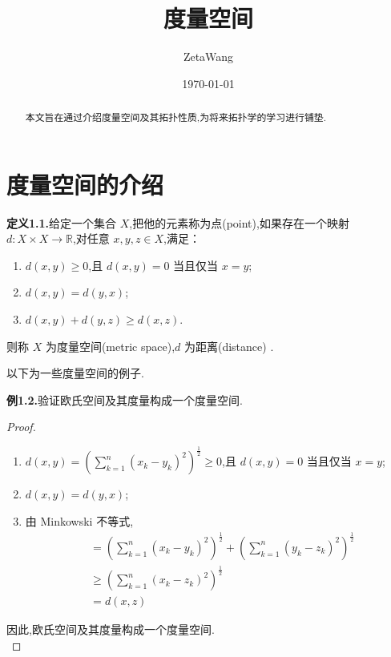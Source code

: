 \documentclass[12pt]{article}
\title{度量空间}
\author{ZetaWang}
\date{\today}
\begin{document}
\maketitle

\begin{abstract}
本文旨在通过介绍度量空间及其拓扑性质,为将来拓扑学的学习进行铺垫.
\end{abstract}

\tableofcontents %
\newpage

\section{度量空间的介绍}
\textbf{定义1.1.}给定一个集合 $X$,把他的元素称为点(point),如果存在一个映射 $d:X\times X\rightarrow \mathbb{R}$,对任意 $x,y,z\in X$,满足：
\begin{enumerate}[label={\textbullet}]
    \item $d(x,y)\geq 0$,且 $d(x,y) = 0$ 当且仅当 $x=y$;
    \item $d(x,y) = d(y,x)$;
    \item $d(x,y) + d(y,z) \geq d(x,z)$.
\end{enumerate}
则称 $X$ 为度量空间(metric space),$d$ 为距离(distance) .\setlength{\parskip}{1em} %

以下为一些度量空间的例子.\setlength{\parskip}{1em} %

\textbf{例1.2.}验证欧氏空间及其度量构成一个度量空间.
\begin{proof}
    \leavevmode
    \begin{enumerate}[label={\textbullet}]
        \item $d(x,y) = (\sum\limits_{k=1}^{n}( x_k-y_k)^2)^{\frac{1}{2}} \geq 0$,且 $d(x,y) = 0$ 当且仅当 $x=y$;
        \item $d(x,y) = d(y,x)$;
        \item 由 Minkowski 不等式,
        \begin{align*}
            & = (\sum_{k=1}^{n}( x_k-y_k)^2)^\frac{1}{2} + (\sum_{k=1}^{n}( y_k-z_k)^2)^{\frac{1}{2}} \\
            & \geq (\sum_{k=1}^{n}( x_k-z_k)^2)^{\frac{1}{2}} \\
            & = d(x,z)
        \end{align*}
    \end{enumerate}
    因此,欧氏空间及其度量构成一个度量空间.\\
\end{proof}
\end{document}
